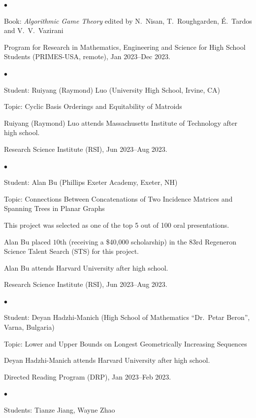 \documentclass[margin,line]{res}
\newenvironment{list2}{
  \begin{list}{$\bullet$}{%
      \setlength{\itemsep}{0in}
      \setlength{\parsep}{0in} \setlength{\parskip}{0in}
      \setlength{\topsep}{0in} \setlength{\partopsep}{0in}
      \setlength{\leftmargin}{0.2in}}}{\end{list}}
\newenvironment{list3}{
  \begin{list}{\ding{113}}{%
      \setlength{\itemsep}{0.05in}
      \setlength{\parsep}{0.025in} \setlength{\parskip}{0in}
      \setlength{\topsep}{0in} \setlength{\partopsep}{0in}
      \setlength{\leftmargin}{0.17in}}}{\end{list}}
\begin{document}
\begin{resume}
\begin{list3}
\begin{list2}
  \item[$\circ$] Book: \emph{Algorithmic Game Theory} edited by N.\ Nisan, T.\ Roughgarden, \'E.\ Tardos and V.\ V.\ Vazirani
  \end{list2}
\item[] Program for Research in Mathematics, Engineering and Science for High School Students (PRIMES-USA, remote), Jan 2023--Dec 2023.
  \begin{list2}
  \item[$\circ$] Student: Ruiyang (Raymond) Luo (University High School, Irvine, CA)
  \item[$\circ$] Topic: Cyclic Basis Orderings and Equitability of Matroids
  \item[$\circ$] Ruiyang (Raymond) Luo attends Massachusetts Institute of Technology after high school.
  \end{list2}
\item[] Research Science Institute (RSI), Jun 2023--Aug 2023.
  \begin{list2}
  \item[$\circ$] Student: Alan Bu (Phillips Exeter Academy, Exeter, NH)
  \item[$\circ$] Topic: Connections Between Concatenations of Two Incidence Matrices and Spanning Trees in Planar Graphs
  \item[$\circ$] This project was selected as one of the top 5 out of 100 oral presentations.
  \item[$\circ$] Alan Bu placed $10$th (receiving a \$40,000 scholarship) in the $83$rd Regeneron Science Talent Search (STS) for this project.
  \item[$\circ$] Alan Bu attends Harvard University after high school.
  \end{list2}
\item[] Research Science Institute (RSI), Jun 2023--Aug 2023.
  \begin{list2}
  \item[$\circ$] Student: Deyan Hadzhi-Manich (High School of Mathematics ``Dr.\ Petar Beron'', Varna, Bulgaria)
  \item[$\circ$] Topic: Lower and Upper Bounds on Longest Geometrically Increasing Sequences
  \item[$\circ$] Deyan Hadzhi-Manich attends Harvard University after high school.
  \end{list2}
\item[] Directed Reading Program (DRP), Jan 2023--Feb 2023.
  \begin{list2}
  \item[$\circ$] Students: Tianze Jiang, Wayne Zhao

\end{list2}
\end{list3}
\end{resume}
\end{document}
